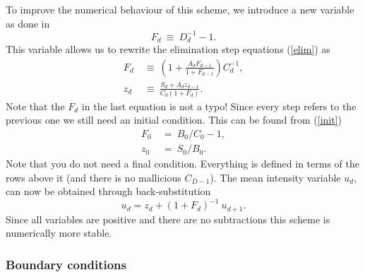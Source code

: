 \documentclass[]{article}
\begin{document}
To improve the numerical behaviour of this scheme, we introduce a new variable as done in \cite{Rybicki1991}
\begin{equation}
F_{d} \ \equiv \ D_{d}^{-1} - 1.
\end{equation}
This variable allows us to rewrite the elimination step equations (\ref{elim}) as
\begin{equation}
\begin{split}
F_{d} \ &\equiv \ \left( 1 + \frac{A_{d}F_{d-1}}{1+F_{d-1}} \right) C_{d}^{-1}, \\
z_{d} \ &\equiv \ \frac{S_{d} + A_{d} z_{d-1}}{C_{d}\left(1+F_{d}\right)}.
\end{split}
\end{equation}
Note that the $F_{d}$ in the last equation is not a typo! Since every step refers to the previous one we still need an initial condition. This can be found from (\ref{init})
\begin{equation}
\begin{split}
F_{0} \ &= \ B_{0} / C_{0} - 1, \\
z_{0} \ &= \ S_{0} / B_{0}.
\end{split}
\end{equation}
Note that you do not need a final condition. Everything is defined in terms of the rows above it (and there is no mallicious $C_{D-1}$).
The mean intensity variable $u_{d}$, can now be obtained through back-substitution
\begin{equation}
u_{d} = z_{d} + \left(1+F_{d}\right)^{-1} \ u_{d+1}  .
\end{equation}
Since all variables are positive and there are no subtractions this scheme is numerically more stable.


\subsubsection{Boundary conditions}
\end{document}

